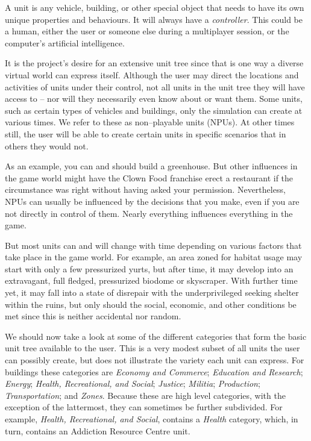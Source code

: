 

A unit is any vehicle, building, or other special object that needs to have its own unique properties and behaviours. It will always have a {\it controller}. This could be a human, either the user or someone else during a multiplayer session, or the computer's artificial intelligence.

It is the project's desire for an extensive unit tree since that is one way a diverse virtual world can express itself. Although the user may direct the locations and activities of units under their control, not all units in the unit tree they will have access to -- nor will they necessarily even know about or want them. Some units, such as certain types of vehicles and buildings, only the simulation can create at various times. We refer to these as non--playable units (NPUs). At other times still, the user will be able to create certain units in specific scenarios that in others they would not.

As an example, you can and should build a greenhouse. But other influences in the game world might have the Clown Food franchise erect a restaurant if the circumstance was right without having asked your permission. Nevertheless, NPUs can usually be influenced by the decisions that you make, even if you are not directly in control of them. Nearly everything influences everything in the game.

But most units can and will change with time depending on various factors that take place in the game world. For example, an area zoned for habitat usage may start with only a few pressurized yurts, but after time, it may develop into an extravagant, full fledged, pressurized biodome or skyscraper. With further time yet, it may fall into a state of disrepair with the underprivileged seeking shelter within the ruins, but only should the social, economic, and other conditions be met since this is neither accidental nor random.

We should now take a look at some of the different categories that form the basic unit tree available to the user. This is a very modest subset of all units the user can possibly create, but does not illustrate the variety each unit can express. For buildings these categories are {\it Economy and Commerce}; {\it Education and Research}; {\it Energy}; {\it Health, Recreational, and Social}; {\it Justice}; {\it Militia}; {\it Production}; {\it Transportation}; and {\it Zones}. Because these are high level categories, with the exception of the lattermost, they can sometimes be further subdivided. For example, {\it Health, Recreational, and Social}, contains a {\it Health} category, which, in turn, contains an Addiction Resource Centre unit.

